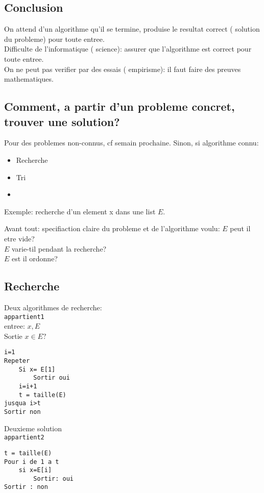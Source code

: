 \documentclass[../main.tex]{subfiles}
\begin{document}
\subsection{Conclusion}
On attend d'un algorithme qu'il se termine, produise le resultat correct ( solution du probleme) pour toute entree.\\

Difficulte de l'informatique ( science): assurer que l'algorithme est correct pour toute entree.\\

On ne peut pas verifier par des essais ( empirisme): il faut faire des preuves mathematiques.

\subsection{Comment, a partir d'un probleme concret, trouver une solution?}
Pour des problemes non-connus, cf semain prochaine.
Sinon, si algorithme connu:
\begin{itemize}
\item Recherche 
\item Tri
\item 
\end{itemize}
Exemple: recherche d'un element x dans une list $E$.

Avant tout: specifiaction claire du probleme et de l'algorithme voulu:
$E$ peut il etre vide?\\
$E$ varie-til pendant la recherche?\\
$E$ est il ordonne?\\

\subsection{Recherche}

Deux algorithmes de recherche:\\
\texttt{appartient1}\\
entree: $x,E$ \\
Sortie $x \in E ?$ 
\begin{lstlisting}
i=1
Repeter
	Si x= E[1]
		Sortir oui
	i=i+1
	t = taille(E)
jusqua i>t
Sortir non
\end{lstlisting}
Deuxieme solution\\
\texttt{appartient2}\\
\begin{lstlisting}
t = taille(E)
Pour i de 1 a t
	si x=E[i]
		Sortir: oui
Sortir : non
\end{lstlisting}
\end{document}
